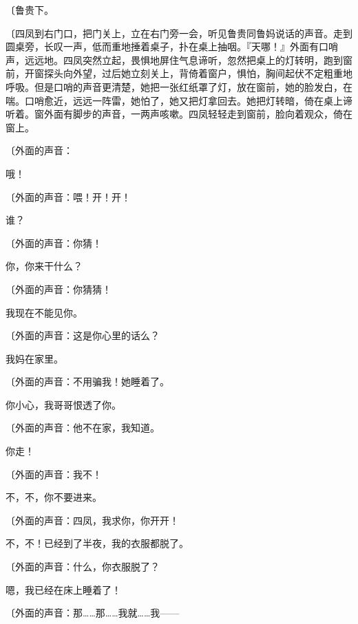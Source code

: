 {\fangsong〔鲁贵下。}

{\fangsong〔四凤到右门口，把门关上，立在右门旁一会，听见鲁贵同鲁妈说话的声音。走到圆桌旁，长叹一声，低而重地捶着桌子，扑在桌上抽咽。『天哪！』外面有口哨声，远远地。四凤突然立起，畏惧地屏住气息谛听，忽然把桌上的灯转明，跑到窗前，开窗探头向外望，过后她立刻关上，背倚着窗户，惧怕，胸间起伏不定粗重地呼吸。但是口哨的声音更清楚，她把一张红纸罩了灯，放在窗前，她的脸发白，在喘。口哨愈近，远远一阵雷，她怕了，她又把灯拿回去。她把灯转暗，倚在桌上谛听着。窗外面有脚步的声音，一两声咳嗽。四凤轻轻走到窗前，脸向着观众，倚在窗上。}

{\fangsong〔外面的声音：}

哦！

{\fangsong〔外面的声音：喂！开！开！}

谁？

{\fangsong〔外面的声音：你猜！}

你，你来干什么？

{\fangsong〔外面的声音：你猜猜！}

我现在不能见你。

{\fangsong〔外面的声音：这是你心里的话么？}

我妈在家里。

{\fangsong〔外面的声音：不用骗我！她睡着了。}

你小心，我哥哥恨透了你。

{\fangsong〔外面的声音：他不在家，我知道。}

你走！

{\fangsong〔外面的声音：我不！}

不，不，你不要进来。

{\fangsong〔外面的声音：四凤，我求你，你开开！}

不，不！已经到了半夜，我的衣服都脱了。

{\fangsong〔外面的声音：什么，你衣服脱了？}

嗯，我已经在床上睡着了！

{\fangsong〔外面的声音：那……那……我就……我——}

